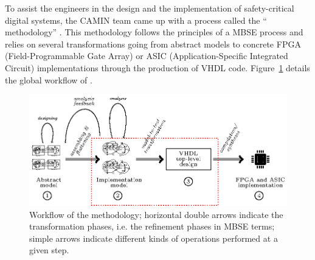To assist the engineers in the design and the implementation of
safety-critical digital systems, the CAMIN team came up with a process
called the ``\hilecop{} methodology'' \cite{Andreu2009}.  This
methodology follows the principles of a MBSE process and relies on
several transformations going from abstract models to concrete FPGA
(Field-Programmable Gate Array) or ASIC (Application-Specific
Integrated Circuit) implementations through the production of VHDL
code. Figure~\ref{fig:hilecop-wf} details the global workflow of
\hilecop{}.

\begin{figure}[H]
\centering
\includegraphics[keepaspectratio=true,width=\textwidth]{hilecop-wf.eps}
\caption[Workflow of the \hilecop{} methodology.]{Workflow of the
  \hilecop{} methodology; horizontal double arrows indicate the
  transformation phases, i.e. the refinement phases in MBSE terms;
  simple arrows indicate different kinds of operations performed at a
  given step.}
\label{fig:hilecop-wf}
\end{figure}

